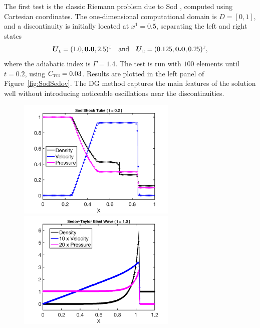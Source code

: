 \documentclass[letterpaper]{jpconf}
\newcommand{\vect}[1]{\boldsymbol{#1}}
\newcommand{\trans}{\textnormal{\tiny\textsc{T}}}
\newcommand{\leftState}{\textnormal{\tiny\textsc{L}}}
\newcommand{\rightState}{\textnormal{\tiny\textsc{R}}}
\newcommand{\TCI}{\textnormal{\tiny\textsc{TCI}}}
\begin{document}
The first test is the classic Riemann problem due to Sod \cite{sod_1978}, computed using Cartesian coordinates.  
The one-dimensional computational domain is $D=[0,1]$, and a discontinuity is initially located at $x^{1}=0.5$, separating the left and right states
\begin{equation*}
  \vect{U}_{\leftState}=(1.0,\vect{0.0},2.5)^{\trans}\quad\text{and}\quad
  \vect{U}_{\rightState}=(0.125,\vect{0.0},0.25)^{\trans},
\end{equation*}
where the adiabatic index is $\Gamma=1.4$.  
The test is run with $100$ elements until $t=0.2$, using $C_{\TCI}=0.03$.  
Results are plotted in the left panel of Figure~\ref{fig:SodSedov}.  
The DG method captures the main features of the solution well without introducing noticeable oscillations near the discontinuities.  
\begin{figure}[h]
  \centering
  \begin{minipage}{18pc}
    \includegraphics[width=18pc]{./Figures/Sod_Astronum_2018}
  \end{minipage}\hspace{0.5pc}%
  \begin{minipage}{18pc}
    \includegraphics[width=18pc]{./Figures/Sedov_Astronum_2018}

\end{minipage}
\end{figure}
\end{document}
